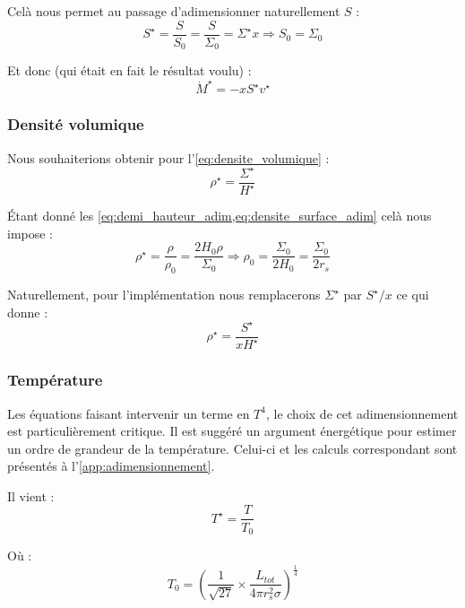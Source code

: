 Celà nous permet au passage d’adimensionner naturellement $S$ :
\begin{equation}
    S^\star = \frac{S}{S_0} = \frac{S}{\Sigma_0} = \Sigma^\star x \Rightarrow S_0 = \Sigma_0
\end{equation}

Et donc (qui était en fait le résultat voulu) :
\begin{equation}
    \dot{M}^\star = - x S^\star v^\star
\end{equation}

\subsubsection{Densité volumique}

Nous souhaiterions obtenir pour l’\cref{eq:densite_volumique} :
\begin{equation}
    \rho^\star = \frac{\Sigma^\star}{H^\star}
\end{equation}

Étant donné les \cref{eq:demi_hauteur_adim,eq:densite_surface_adim} celà nous
impose :
\begin{equation}
    \rho^\star = \frac{\rho}{\rho_0} = \frac{2 H_0 \rho}{\Sigma_0} \Rightarrow \rho_0 = \frac{\Sigma_0}{2 H_0} = \frac{\Sigma_0}{2 r_s}
\end{equation}

Naturellement, pour l’implémentation nous remplacerons $\Sigma^\star$ par
$S^\star/x$ ce qui donne :
\begin{equation}
    \rho^\star = \frac{S^\star}{x H^\star}
\end{equation}

\subsubsection{Température}

Les équations faisant intervenir un terme en $T^4$, le choix de cet
adimensionnement est particulièrement critique. Il est suggéré un argument
énergétique pour estimer un ordre de grandeur de la température. Celui-ci et
les calculs correspondant sont présentés à l’\cref{app:adimensionnement}. 

Il vient :
\begin{equation}
    T^{\star} = \frac{T}{T_0}
\end{equation}

Où :
\begin{equation}
    T_0 = \left(\frac{1}{\sqrt{27}} \times \frac{L_{tot}}{4 \pi r_s^2 \sigma} \right)^\frac{1}{4}
\end{equation}

